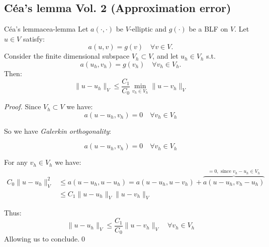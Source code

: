 \subsection{Céa's lemma Vol. 2 (Approximation error)}
\begin{theorem}{Céa's lemma}{cea-lemma}
    Let $a(\cdot, \cdot)$ be $V$-elliptic and $g(\cdot)$ be a BLF on $V$. Let $u \in V$ satisfy:
    \[
        a(u, v) = g(v) \quad \forall v \in V.
    \]
    Consider the finite dimensional subspace $V_h \subset V$, and let $u_h \in V_h$ s.t.
    \[
        a(u_h, v_h) = g(v_h) \quad \forall v_h \in V_h.
    \]
    Then:
    \[
        \|u - u_h\|_V \leq \frac{C_1}{C_0} \min_{v_h \in V_h} \|u - v_h\|_V
    \]
\end{theorem}
\begin{proof}
    Since $V_h \subset V$ we have:
    \[
        a(u - u_h, v_h) = 0 \quad \forall v_h \in V_h
    \]

    So we have \emph{Galerkin orthogonality}:

    \[
        a(u - u_h,v_h) = 0 \quad \forall v_h \in V_h
    \]

    For any $v_h \in V_h$ we have:
    \begin{align*}
        C_0 \|u - u_h\|_V^2 & \leq a(u - u_h, u - u_h) \tag{coercivity} = a(u - u_h, u - v_h) + \overbrace{a(u - u_h, v_h - u_h)}^{= 0, \text{ since } v_h - u_h \in V_h} \\
                            & \leq C_1 \|u - u_h\|_V \|u - v_h\|_V \tag{continuity}
    \end{align*}

    Thus:
    \[
        \|u - u_h\|_V \leq \frac{C_1}{C_0} \|u - v_h\|_V \quad \forall v_h \in V_h
    \]
    Allowing us to conclude.\qed
\end{proof}